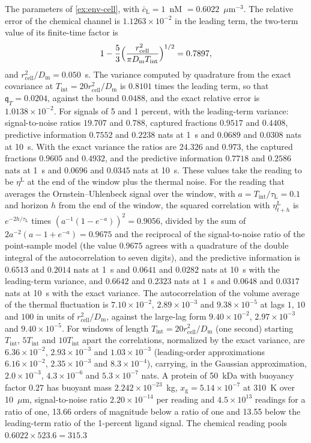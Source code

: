 \begin{numcheck}\label{chk:env-cell}
The parameters of \cref{ex:env-cell}, with $\bar c_{\mathrm L}=1$~nM $=0.6022$~$\mu$m$^{-3}$. The relative error of the chemical channel is $1.1263\times10^{-2}$ in the leading term, the two-term value of its finite-time factor is
\[
1-\frac53\Bigl(\frac{r_{\mathrm{cell}}^2}{\pi D_{\mathrm m}T_{\mathrm{int}}}\Bigr)^{1/2}=0.7897,
\]
and $r_{\mathrm{cell}}^2/D_{\mathrm m}=0.050$~s. The variance computed by quadrature from the exact covariance at $T_{\mathrm{int}}=20r_{\mathrm{cell}}^2/D_{\mathrm m}$ is $0.8101$ times the leading term, so that $\mathfrak q_T=0.0204$, against the bound $0.0488$, and the exact relative error is $1.0138\times10^{-2}$. For signals of 5 and 1 percent, with the leading-term variance: signal-to-noise ratios $19.707$ and $0.788$, captured fractions $0.9517$ and $0.4408$, predictive information $0.7552$ and $0.2238$ nats at 1~s and $0.0689$ and $0.0308$ nats at 10~s. With the exact variance the ratios are $24.326$ and $0.973$, the captured fractions $0.9605$ and $0.4932$, and the predictive information $0.7718$ and $0.2586$ nats at 1~s and $0.0696$ and $0.0345$ nats at 10~s. These values take the reading to be $\eta^{\mathrm L}$ at the end of the window plus the thermal noise. For the reading that averages the Ornstein--Uhlenbeck signal over the window, with $a=T_{\mathrm{int}}/\tau_{\mathrm L}=0.1$ and horizon $h$ from the end of the window, the squared correlation with $\eta^{\mathrm L}_{t+h}$ is $e^{-2h/\tau_{\mathrm L}}$ times $(a^{-1}(1-e^{-a}))^2=0.9056$, divided by the sum of $2a^{-2}(a-1+e^{-a})=0.9675$ and the reciprocal of the signal-to-noise ratio of the point-sample model (the value $0.9675$ agrees with a quadrature of the double integral of the autocorrelation to seven digits), and the predictive information is $0.6513$ and $0.2014$ nats at 1~s and $0.0641$ and $0.0282$ nats at 10~s with the leading-term variance, and $0.6642$ and $0.2323$ nats at 1~s and $0.0648$ and $0.0317$ nats at 10~s with the exact variance. The autocorrelation of the volume average of the thermal fluctuation is $7.10\times10^{-2}$, $2.89\times10^{-3}$ and $9.38\times10^{-5}$ at lags $1$, $10$ and $100$ in units of $r_{\mathrm{cell}}^2/D_{\mathrm m}$, against the large-lag form $9.40\times10^{-2}$, $2.97\times10^{-3}$ and $9.40\times10^{-5}$. For windows of length $T_{\mathrm{int}}=20r_{\mathrm{cell}}^2/D_{\mathrm m}$ (one second) starting $T_{\mathrm{int}}$, $5T_{\mathrm{int}}$ and $10T_{\mathrm{int}}$ apart the correlations, normalized by the exact variance, are $6.36\times10^{-2}$, $2.93\times10^{-3}$ and $1.03\times10^{-3}$ (leading-order approximations $6.16\times10^{-2}$, $2.35\times10^{-3}$ and $8.3\times10^{-4}$), carrying, in the Gaussian approximation, $2.0\times10^{-3}$, $4.3\times10^{-6}$ and $5.3\times10^{-7}$ nats. A protein of 50~kDa with buoyancy factor $0.27$ has buoyant mass $2.242\times10^{-23}$~kg, $x_{\mathrm g}=5.14\times10^{-7}$ at 310~K over 10~$\mu$m, signal-to-noise ratio $2.20\times10^{-14}$ per reading and $4.5\times10^{13}$ readings for a ratio of one, 13.66 orders of magnitude below a ratio of one and 13.55 below the leading-term ratio of the 1-percent ligand signal. The chemical reading pools $0.6022\times523.6=315.3$ 
\end{numcheck}
